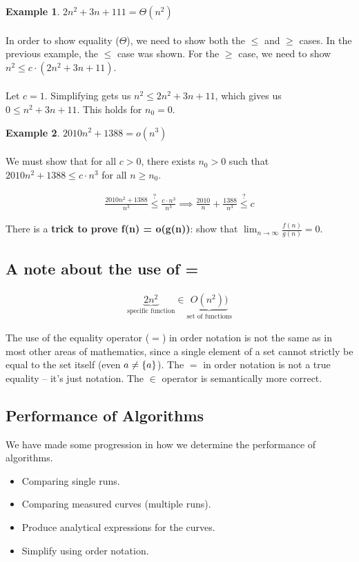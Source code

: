 \documentclass[]{article}
\theoremstyle{definition}
\newtheorem{ex}{Example}[section]
\DeclarePairedDelimiter{\set}{\lbrace}{\rbrace}
\begin{document}
			\begin{ex}
				$2n^2 + 3n + 11 1 = \Theta(n^2)$
				\\ \\
				In order to show equality ($\Theta$), we need to show both the $\le$ and $\ge$ cases. In the previous example, the $\le$ case was shown. For the $\ge$ case, we need to show $n^2 \le c \cdot (2n^2 + 3n + 11)$.
				\\ \\
				Let $c = 1$. Simplifying gets us $n^2 \le 2n^2 + 3n + 11$, which gives us $0 \le n^2 + 3n + 11$. This holds for $n_0 = 0$.
			\end{ex}

			\begin{ex}
				$2010n^2 + 1388 = o(n^3)$
				\\ \\
				We must show that for all $c > 0$, there exists $n_0 > 0$ such that $2010n^2 + 1388 \le c \cdot n^3$ for all $n \ge n_0$.

				\begin{align*}
					\frac{2010n^2+1388}{n^3} \stackrel{?}{\le} \frac{c \cdot n^3}{n^3} \implies \frac{2010}{n} + \frac{1388}{n^3} \stackrel{?}{\le} c
				\end{align*}

				There is a \textbf{trick to prove f(n) = o(g(n))}: show that $\lim_{n \to \infty}{}\frac{f(n)}{g(n)} = 0$.
			\end{ex}

		\subsection{A note about the use of =}
			\begin{align*}
				\underbrace{2n^2}_\text{specific function} \in \underbrace{O(n^2))}_\text{set of functions}
			\end{align*}

			The use of the equality operator ($=$) in order notation is not the same as in most other areas of mathematics, since a single element of a set cannot strictly be equal to the set itself (even $a \ne \set{a}$). The $=$ in order notation is not a true equality -- it's just notation. The $\in$ operator is semantically more correct.

		\subsection{Performance of Algorithms}
			We have made some progression in how we determine the performance of algorithms.
			\begin{itemize}
				\item Comparing single runs.
				\item Comparing measured curves (multiple runs).
				\item Produce analytical expressions for the curves.
				\item Simplify using order notation.
			\end{itemize}
\end{document}

